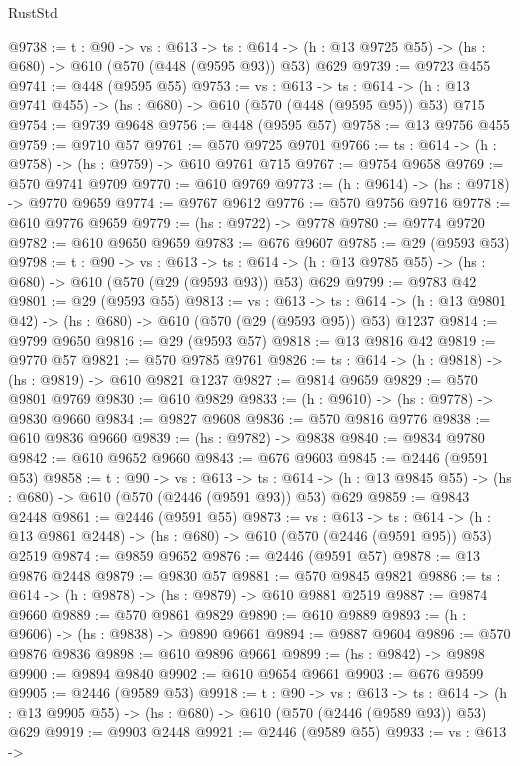 \begin{lexlean}{RustStd}
\begin{coremodule}
@9738 := {t : @90} ->
  {vs : @613} ->
  {ts : @614} -> (h : @13 @9725 @55) -> (hs : @680) -> @610 (@570 (@448 (@9595 @93)) @53) @629
@9739 := @9723 @455
@9741 := @448 (@9595 @55)
@9753 := {vs : @613} ->
  {ts : @614} -> (h : @13 @9741 @455) -> (hs : @680) -> @610 (@570 (@448 (@9595 @95)) @53) @715
@9754 := @9739 @9648
@9756 := @448 (@9595 @57)
@9758 := @13 @9756 @455
@9759 := @9710 @57
@9761 := @570 @9725 @9701
@9766 := {ts : @614} -> (h : @9758) -> (hs : @9759) -> @610 @9761 @715
@9767 := @9754 @9658
@9769 := @570 @9741 @9709
@9770 := @610 @9769
@9773 := (h : @9614) -> (hs : @9718) -> @9770 @9659
@9774 := @9767 @9612
@9776 := @570 @9756 @9716
@9778 := @610 @9776 @9659
@9779 := (hs : @9722) -> @9778
@9780 := @9774 @9720
@9782 := @610 @9650 @9659
@9783 := @676 @9607
@9785 := @29 (@9593 @53)
@9798 := {t : @90} ->
  {vs : @613} ->
  {ts : @614} -> (h : @13 @9785 @55) -> (hs : @680) -> @610 (@570 (@29 (@9593 @93)) @53) @629
@9799 := @9783 @42
@9801 := @29 (@9593 @55)
@9813 := {vs : @613} ->
  {ts : @614} -> (h : @13 @9801 @42) -> (hs : @680) -> @610 (@570 (@29 (@9593 @95)) @53) @1237
@9814 := @9799 @9650
@9816 := @29 (@9593 @57)
@9818 := @13 @9816 @42
@9819 := @9770 @57
@9821 := @570 @9785 @9761
@9826 := {ts : @614} -> (h : @9818) -> (hs : @9819) -> @610 @9821 @1237
@9827 := @9814 @9659
@9829 := @570 @9801 @9769
@9830 := @610 @9829
@9833 := (h : @9610) -> (hs : @9778) -> @9830 @9660
@9834 := @9827 @9608
@9836 := @570 @9816 @9776
@9838 := @610 @9836 @9660
@9839 := (hs : @9782) -> @9838
@9840 := @9834 @9780
@9842 := @610 @9652 @9660
@9843 := @676 @9603
@9845 := @2446 (@9591 @53)
@9858 := {t : @90} ->
  {vs : @613} ->
  {ts : @614} -> (h : @13 @9845 @55) -> (hs : @680) -> @610 (@570 (@2446 (@9591 @93)) @53) @629
@9859 := @9843 @2448
@9861 := @2446 (@9591 @55)
@9873 := {vs : @613} ->
  {ts : @614} -> (h : @13 @9861 @2448) -> (hs : @680) -> @610 (@570 (@2446 (@9591 @95)) @53) @2519
@9874 := @9859 @9652
@9876 := @2446 (@9591 @57)
@9878 := @13 @9876 @2448
@9879 := @9830 @57
@9881 := @570 @9845 @9821
@9886 := {ts : @614} -> (h : @9878) -> (hs : @9879) -> @610 @9881 @2519
@9887 := @9874 @9660
@9889 := @570 @9861 @9829
@9890 := @610 @9889
@9893 := (h : @9606) -> (hs : @9838) -> @9890 @9661
@9894 := @9887 @9604
@9896 := @570 @9876 @9836
@9898 := @610 @9896 @9661
@9899 := (hs : @9842) -> @9898
@9900 := @9894 @9840
@9902 := @610 @9654 @9661
@9903 := @676 @9599
@9905 := @2446 (@9589 @53)
@9918 := {t : @90} ->
  {vs : @613} ->
  {ts : @614} -> (h : @13 @9905 @55) -> (hs : @680) -> @610 (@570 (@2446 (@9589 @93)) @53) @629
@9919 := @9903 @2448
@9921 := @2446 (@9589 @55)
@9933 := {vs : @613} ->

\end{coremodule}
\end{lexlean}
